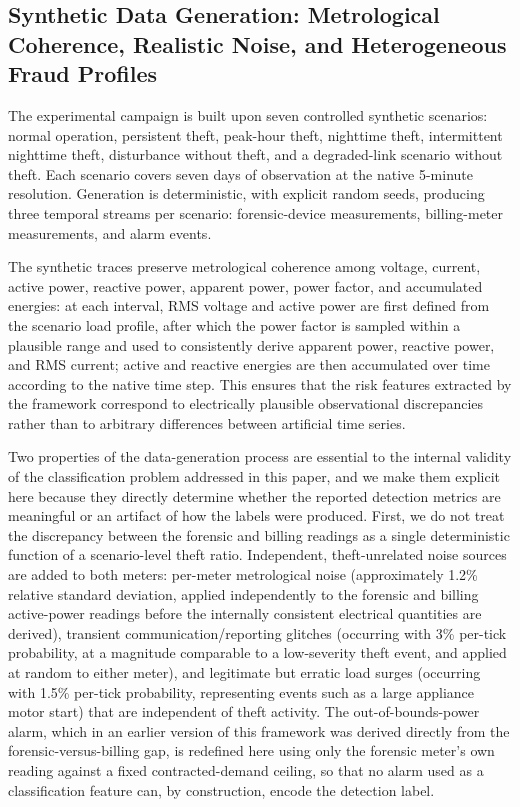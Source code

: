 \documentclass{ieeeaccess}
\begin{document}
\subsection{Synthetic Data Generation: Metrological Coherence, Realistic Noise, and Heterogeneous Fraud Profiles}
\label{subsec:synthetic_realism}
The experimental campaign is built upon seven controlled synthetic scenarios: normal operation, persistent theft, peak-hour theft, nighttime theft, intermittent nighttime theft, disturbance without theft, and a degraded-link scenario without theft. Each scenario covers seven days of observation at the native 5-minute resolution. Generation is deterministic, with explicit random seeds, producing three temporal streams per scenario: forensic-device measurements, billing-meter measurements, and alarm events.

The synthetic traces preserve metrological coherence among voltage, current, active power, reactive power, apparent power, power factor, and accumulated energies: at each interval, RMS voltage and active power are first defined from the scenario load profile, after which the power factor is sampled within a plausible range and used to consistently derive apparent power, reactive power, and RMS current; active and reactive energies are then accumulated over time according to the native time step. This ensures that the risk features extracted by the framework correspond to electrically plausible observational discrepancies rather than to arbitrary differences between artificial time series.

Two properties of the data-generation process are essential to the internal validity of the classification problem addressed in this paper, and we make them explicit here because they directly determine whether the reported detection metrics are meaningful or an artifact of how the labels were produced. First, we do not treat the discrepancy between the forensic and billing readings as a single deterministic function of a scenario-level theft ratio. Independent, theft-unrelated noise sources are added to both meters: per-meter metrological noise (approximately 1.2\% relative standard deviation, applied independently to the forensic and billing active-power readings before the internally consistent electrical quantities are derived), transient communication/reporting glitches (occurring with 3\% per-tick probability, at a magnitude comparable to a low-severity theft event, and applied at random to either meter), and legitimate but erratic load surges (occurring with 1.5\% per-tick probability, representing events such as a large appliance motor start) that are independent of theft activity. The out-of-bounds-power alarm, which in an earlier version of this framework was derived directly from the forensic-versus-billing gap, is redefined here using only the forensic meter's own reading against a fixed contracted-demand ceiling, so that no alarm used as a classification feature can, by construction, encode the detection label.
\end{document}
